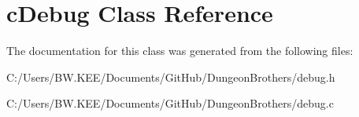 \hypertarget{classc_debug}{\section{c\-Debug Class Reference}
\label{classc_debug}
}


The documentation for this class was generated from the following files\-:\begin{DoxyCompactItemize}
\item 
C\-:/\-Users/\-B\-W.\-K\-E\-E/\-Documents/\-Git\-Hub/\-Dungeon\-Brothers/debug.\-h\item 
C\-:/\-Users/\-B\-W.\-K\-E\-E/\-Documents/\-Git\-Hub/\-Dungeon\-Brothers/debug.\-c\end{DoxyCompactItemize}
